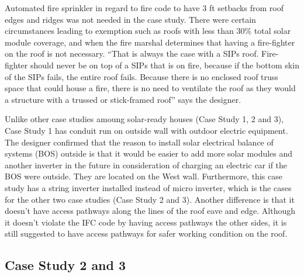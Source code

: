 \documentclass[]{article}
\begin{document}
Automated fire sprinkler in regard to fire code to have 3 ft setbacks
from roof edges and ridges was not needed in the case study. There were
certain circumstances leading to exemption such as roofs with less than
30\% total solar module coverage, and when the fire marshal determines
that having a fire-fighter on the roof is not necessary. ``That is
always the case with a SIPs roof. Fire-fighter should never be on top of
a SIPs that is on fire, because if the bottom skin of the SIPs fails,
the entire roof fails. Because there is no enclosed roof truss space
that could house a fire, there is no need to ventilate the roof as they
would a structure with a trussed or stick-framed roof'' says the
designer.

Unlike other case studies amoung solar-ready houses (Case Study 1, 2 and
3), Case Study 1 has conduit run on outside wall with outdoor electric
equipment. The designer confirmed that the reason to install solar
electrical balance of systems (BOS) outside is that it would be easier
to add more solar modules and another inverter in the future in
consideration of charging an electric car if the BOS were outside. They
are located on the West wall. Furthermore, this case study has a string
inverter installed instead of micro inverter, which is the cases for the
other two case studies (Case Study 2 and 3). Another difference is that
it doesn't have access pathways along the lines of the roof eave and
edge. Although it doesn't violate the IFC code by having access pathways
the other sides, it is still suggested to have access pathways for safer
working condition on the roof.

\hypertarget{case-study-2-and-3}{%
\subsection{Case Study 2 and 3}\label{case-study-2-and-3}}
\end{document}
